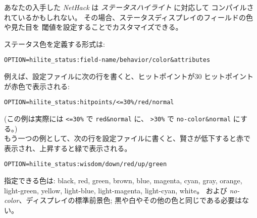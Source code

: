 あなたの入手した {\it NetHack\/} は {\it ステータスハイライト} に対応して
コンパイルされているかもしれない。
その場合、ステータスディスプレイのフィールドの色や見た目を
閾値を設定することでカスタマイズできる。

ステータス色を定義する形式は:\\
\begin{verbatim}
OPTION=hilite_status:field-name/behavior/color&attributes
\end{verbatim}

例えば、設定ファイルに次の行を書くと、ヒットポイントが30%
ヒットポイントが赤色で表示される:\\
\begin{verbatim}
OPTION=hilite_status:hitpoints/<=30%/red/normal
\end{verbatim}
(この例は実際には {\tt <=30\%} で {\tt red\&normal} に、
{\tt >30\%} で {\tt no-color\&normal} にする。)\\

もう一つの例として、次の行を設定ファイルに書くと、賢さが低下すると赤で
表示され、上昇すると緑で表示される。\\
\begin{verbatim}
OPTION=hilite_status:wisdom/down/red/up/green
\end{verbatim}

指定できる色は:
black, red, green, brown, blue, magenta, cyan, gray,
orange, light-green, yellow, light-blue, light-magenta, light-cyan, white。
および {\it no-color}、ディスプレイの標準前景色;
黒や白やその他の色と同じである必要はない。

